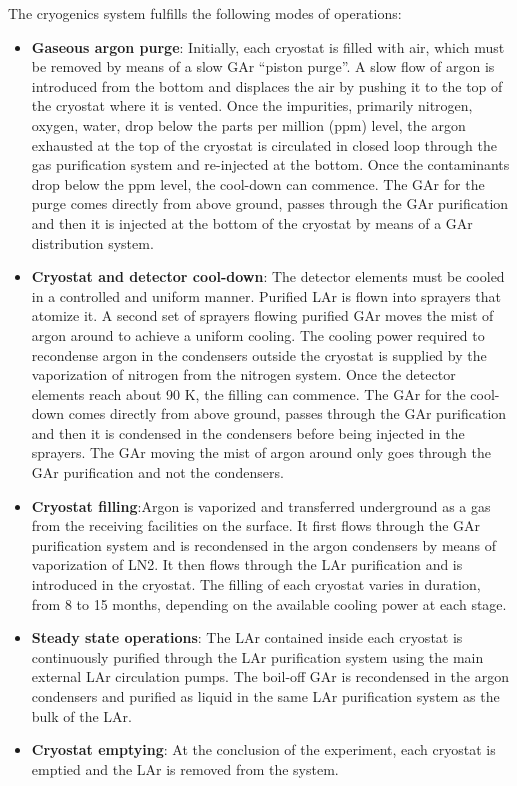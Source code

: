 The cryogenics system fulfills the following modes of operations:
\begin{itemize}
  \item {\bf Gaseous argon purge}: Initially, each cryostat is filled
    with air, which must be removed by means of a slow GAr ``piston
    purge''.  A slow flow of argon is introduced from the bottom and
    displaces the air by pushing it to the top of the cryostat where
    it is vented.  Once the impurities, primarily nitrogen, oxygen,
    water, drop below the parts per million (ppm) level, the argon
    exhausted at the top of the cryostat is circulated in closed loop
    through the gas purification system and re-injected at the
    bottom. Once the contaminants drop below the ppm level, the
    cool-down can commence. The GAr for the purge comes directly from
    above ground, passes through the GAr purification and then it is
    injected at the bottom of the cryostat by means of a GAr
    distribution system.
  \item {\bf Cryostat and detector cool-down}: The detector elements
    must be cooled in a controlled and uniform manner. Purified LAr is
    flown into sprayers that atomize it. A second set of sprayers
    flowing purified GAr moves the mist of argon around to achieve a
    uniform cooling. The cooling power required to recondense argon in
    the condensers outside the cryostat is supplied by the
    vaporization of nitrogen from the nitrogen system. Once the
    detector elements reach about 90 K, the filling can commence. The
    GAr for the cool-down comes directly from above ground, passes
    through the GAr purification and then it is condensed in the
    condensers before being injected in the sprayers. The GAr moving
    the mist of argon around only goes through the GAr purification
    and not the condensers.
  \item {\bf Cryostat filling}:Argon is vaporized and transferred
    underground as a gas from the receiving facilities on the surface.
    It first flows through the GAr purification system and is
    recondensed in the argon condensers by means of vaporization of
    LN2.  It then flows through the LAr purification and is introduced
    in the cryostat. The filling of each cryostat varies in duration,
    from 8 to 15 months, depending on the available cooling power at
    each stage.
  \item{\bf Steady state operations}: The LAr contained inside each
    cryostat is continuously purified through the LAr purification
    system using the main external LAr circulation pumps. The boil-off
    GAr is recondensed in the argon condensers and purified as liquid
    in the same LAr purification system as the bulk of the LAr.
  \item{\bf Cryostat emptying}: At the conclusion of the experiment,
    each cryostat is emptied and the LAr is removed from the system.
\end{itemize}
